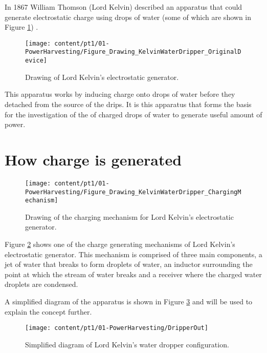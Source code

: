 
In 1867 William Thomson (Lord Kelvin) described an apparatus that
could generate electrostatic charge using drops of water (some of
which are shown in Figure \ref{Figure_Drawing_KelvinWaterDripper_OriginalDevice})
\cite{Thomson1867}.
\begin{figure}[H]
\begin{centering}
\texttt{[image: content/pt1/01-PowerHarvesting/Figure\_Drawing\_KelvinWaterDripper\_OriginalDevice]}
\par\end{centering}

\protect\caption{Drawing of Lord Kelvin's electrostatic generator.}


\label{Figure_Drawing_KelvinWaterDripper_OriginalDevice}

\end{figure}
 This apparatus works by inducing charge onto drops of water before
they detached from the source of the drips. It is this apparatus that
forms the basis for the investigation of the of charged drops of water
to generate useful amount of power.


\section{How charge is generated}

\begin{figure}[H]
\begin{centering}
\texttt{[image: content/pt1/01-PowerHarvesting/Figure\_Drawing\_KelvinWaterDripper\_ChargingMechanism]}
\par\end{centering}

\protect\caption{Drawing of the charging mechanism for Lord Kelvin's electrostatic
generator.}
\label{Figure_Drawing_KelvinWaterDripper_ChargingMechanism}
\end{figure}
Figure \ref{Figure_Drawing_KelvinWaterDripper_ChargingMechanism}
shows one of the charge generating mechanisms of Lord Kelvin's electrostatic
generator. This mechanism is comprised of three main components, a
jet of water that breaks to form droplets of water, an inductor surrounding
the point at which the stream of water breaks and a receiver where
the charged water droplets are condensed.

A simplified diagram of the apparatus is shown in Figure \ref{Fig_Diagram_KelvinWaterDripper}
and will be used to explain the concept further.
\begin{figure}[H]
\begin{centering}
\texttt{[image: content/pt1/01-PowerHarvesting/DripperOut]}
\par\end{centering}

\protect\caption{Simplified diagram of Lord Kelvin's water dropper configuration.}


\label{Fig_Diagram_KelvinWaterDripper}
\end{figure}


